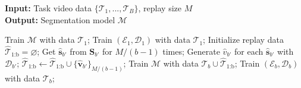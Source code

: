 \begin{algorithm}[t]
\caption{Incremental Temporal Action Segmentation}
\textbf{Input:} Task video data $\{\mathcal{T}_1, ... ,\mathcal{T}_B \}$, replay size $M$\\
\textbf{Output:} Segmentation model $\mathcal{M}$
\begin{algorithmic}[1]
\State Train $\mathcal{M}$ with data $\mathcal{T}_1$;
\State Train $(\mathcal{E}_1, \mathcal{D}_1)$ with data $\mathcal{T}_1$;
    \State Initialize replay data $\hat{\mathcal{T}}_{\text{1:b}} = \varnothing$;
    \State Get $\hat{\mathbf{s}}_{b'}$ from $\mathbf{S}_{b'}$ for $M/(b\!-\!1)$ times; 
    \State Generate $\hat{v}_{b'}$ for each $\hat{\mathbf{s}}_{b'}$ with $\mathcal{D}_{b'}$;
    \State $\hat{\mathcal{T}}_{\text{1:b}} \gets \hat{\mathcal{T}}_{\text{1:b}} \cup \{\hat{\mathbf{v}}_{b'}\}_{M/(b-1)}$;
    \EndFor
    \State Train $\mathcal{M}$ with data $\mathcal{T}_b \cup \hat{\mathcal{T}}_{\text{1:b}}$;
    \State Train $(\mathcal{E}_b, \mathcal{D}_b)$ with data $\mathcal{T}_b$;
\EndFor
\end{algorithmic}
\label{alg:train}
\end{algorithm} 